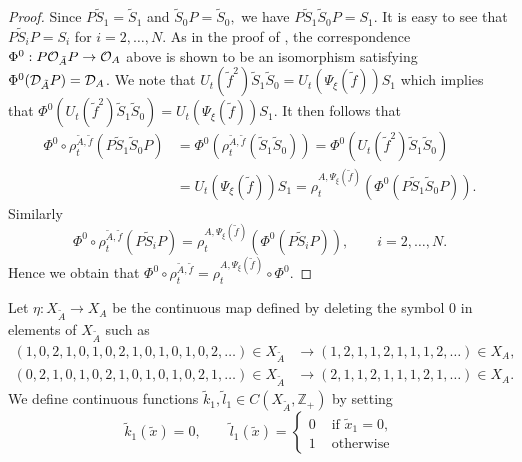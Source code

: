 \documentclass[11pt]{article}
\theoremstyle{plain}
\theoremstyle{definition}
\numberwithin{equation}{section}
\newcommand{\Zp}{{\mathbb{Z}}_+}
\newcommand{\f}{\tilde{f}}
\begin{document}
\begin{proof}
Since
$P \tilde{S}_1 = \tilde{S}_1$
and
$
\tilde{S}_0 P = \tilde{S}_0,
$
we have
$P \tilde{S}_1\tilde{S}_0 P = {S}_1$.
It is easy to see that
$P \tilde{S}_i P = S_i$
for $i=2,\dots,N$.
As in the proof of \cite[4.1 Theorem]{CK}, 
the correspondence
$\Phi^0:P{{\mathcal{O}}_{\tilde{A}}} P \rightarrow {{\mathcal{O}}_A}$ above
is shown to be an isomorphism satisfying 
$\Phi^0({{\mathcal{D}}_{\tilde{A}}} P) = {{\mathcal{D}}_A}$.
We note that 
$
U_t({\f}^2)\tilde{S}_1 \tilde{S}_0 
= U_t(\Psi_\xi(\f))S_1
$
which implies that
$
\Phi^0(U_t({\f}^2)\tilde{S}_1 \tilde{S}_0 )
= U_t(\Psi_\xi(\f))S_1.
$
It then follows that
\begin{align*}
\Phi^0 \circ \rho^{{\tilde{A}},\f}_t(P \tilde{S}_1 \tilde{S}_0 P)
&=\Phi^0(\rho^{{\tilde{A}},\f}_t( \tilde{S}_1 \tilde{S}_0 ))
=\Phi^0 (U_t({\f}^2)\tilde{S}_1 \tilde{S}_0 )\\
&= U_t(\Psi_\xi(\f))S_1 
 = \rho^{A,\Psi_\xi(\f)}_t(\Phi^0(P \tilde{S}_1 \tilde{S}_0 P)).
\end{align*}
Similarly
\begin{equation*}
\Phi^0 \circ \rho^{{\tilde{A}},\f}_t(P \tilde{S}_i P)
 = \rho^{A,\Psi_\xi(\f)}_t(\Phi^0(P \tilde{S}_i P)),
 \qquad 
 i=2,\dots,N.
\end{equation*}
Hence we obtain that 
$\Phi^0 \circ \rho^{{\tilde{A}},\f}_t 
=\rho^{A,\Psi_\xi(\f)}_t\circ \Phi^0$.
\end{proof}
Let 
$\eta:X_{\tilde{A}}\rightarrow X_A$
be the continuous map 
defined by deleting the symbol $0$ in elements of $X_{\tilde{A}}$
such as 
\begin{align*}
(1,0,2,1,0,1,0,2,1,0,1,0,1,0,2, \dots) \in X_{\tilde{A}}
&\rightarrow
(1,2,1,1,2,1,1,1,2, \dots) \in X_A, \\
(0,2,1,0,1,0,2,1,0,1,0,1,0,2,1, \dots) \in X_{\tilde{A}}
&\rightarrow
(2,1,1,2,1,1,1,2,1, \dots) \in X_A.
\end{align*}
We define continuous functions
$\tilde{k}_1, \tilde{l}_1 \in C(X_{\tilde{A}},\Zp)$
by setting
\begin{equation*}
\tilde{k}_1(\tilde{x})=0,
\qquad
\tilde{l}_1(\tilde{x})
=
\begin{cases}
0 & \text{ if } \tilde{x}_1 = 0, \\
1 & \text{ otherwise}
\end{cases}
\end{equation*}
\end{document}
